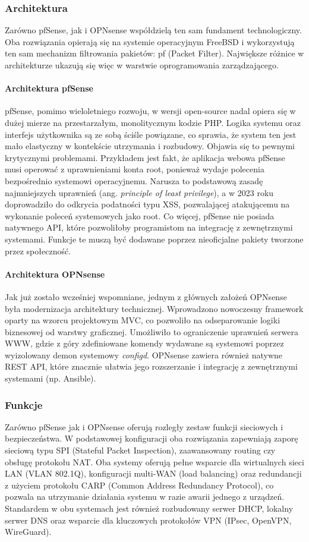 \documentclass[12pt,a4paper]{article}
\begin{document}
\subsubsection{Architektura}
Zarówno pfSense, jak i OPNsense współdzielą ten sam fundament technologiczny. Oba rozwiązania opierają się na systemie operacyjnym FreeBSD i wykorzystują ten sam mechanizm filtrowania pakietów: pf (Packet Filter). Największe różnice w architekturze ukazują się więc w warstwie oprogramowania zarządzającego.

\paragraph{Architektura pfSense}
pfSense, pomimo wieloletniego rozwoju, w wersji open-source nadal opiera się w dużej mierze na przestarzałym, monolitycznym kodzie PHP. Logika systemu oraz interfejs użytkownika są ze sobą ściśle powiązane, co sprawia, że system ten jest mało elastyczny w kontekście utrzymania i rozbudowy. Objawia się to pewnymi krytycznymi problemami. Przykładem jest fakt, że aplikacja webowa pfSense musi operować z uprawnieniami konta root, ponieważ wydaje polecenia bezpośrednio systemowi operacyjnemu. Narusza to podstawową zasadę najmniejszych uprawnień (ang. \textit{principle of least privilege}), a w 2023 roku doprowadziło do odkrycia podatności typu XSS, pozwalającej atakującemu na wykonanie poleceń systemowych jako root. Co więcej, pfSense nie posiada natywnego API, które pozwoliłoby programistom na integrację z zewnętrznymi systemami. Funkcje te muszą być dodawane poprzez nieoficjalne pakiety tworzone przez społeczność.

\paragraph{Architektura OPNsense}
Jak już zostało wcześniej wspomniane, jednym z głównych założeń OPNsense była modernizacja architektury technicznej. Wprowadzono nowoczesny framework oparty na wzorcu projektowym MVC, co pozwoliło na odseparowanie logiki biznesowej od warstwy graficznej. Umożliwiło to ograniczenie uprawnień serwera WWW, gdzie z góry zdefiniowane komendy wydawane są systemowi poprzez wyizolowany demon systemowy \textit{configd}. OPNsense zawiera również natywne REST API, które znacznie ułatwia jego rozszerzanie i integrację z zewnętrznymi systemami (np. Ansible).

\subsubsection{Funkcje}
Zarówno pfSense jak i OPNsense oferują rozległy zestaw funkcji sieciowych i bezpieczeństwa. W podstawowej konfiguracji oba rozwiązania zapewniają zaporę sieciową typu SPI (Stateful Packet Inspection), zaawansowany routing czy obsługę protokołu NAT. Oba systemy oferują pełne wsparcie dla wirtualnych sieci LAN (VLAN 802.1Q), konfiguracji multi-WAN (load balancing) oraz redundancji z użyciem protokołu CARP (Common Address Redundancy Protocol), co pozwala na utrzymanie działania systemu w razie awarii jednego z urządzeń. Standardem w obu systemach jest również rozbudowany serwer DHCP, lokalny serwer DNS oraz wsparcie dla kluczowych protokołów VPN (IPsec, OpenVPN, WireGuard).
\end{document}
